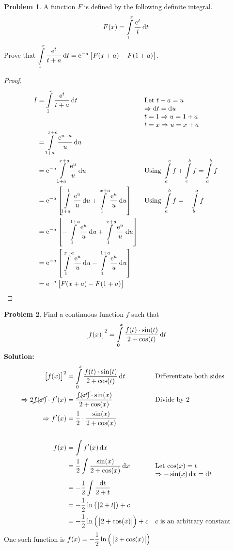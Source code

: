 \documentclass[14]{article}
\theoremstyle{definition}
\newtheorem{prob}{Problem}
\theoremstyle{case}
\begin{document}
\begin{prob}
A function $F$ is defined by the following definite integral.
\[F(x) = \int\limits_1^x \dfrac{{\rm e}^t}{t} \dif t\]
Prove that $\displaystyle\int\limits_1^x \dfrac{{\rm e}^t}{t+a} \dif t = {\rm e}^{-a} \left[ F(x+a) - F(1+a) \right]$.\\
\begin{proof}
\begin{align*}
I &= \int\limits_1^x \dfrac{{\rm e}^t}{t+a} \dif t && \parbox[t]{3cm}{
	Let $t+a = u$\\
	$\Rightarrow \dif t = \dif u$\\
	$t = 1 \Rightarrow u = 1 + a$\\
	$t = x \Rightarrow u = x + a$
}\\
&= \int\limits_{1+a}^{x+a} \dfrac{{\rm e}^{u-a}}{u} \dif u\\
&= {\rm e}^{-a}\int\limits_{1+a}^{x+a} \dfrac{{\rm e}^{u}}{u} \dif u && \text{Using } \int\limits_a^c f + \int\limits_c^b f = \int\limits_a^b f\\ 
&= {\rm e}^{-a} \left[\int\limits_{1+a}^1 \dfrac{{\rm e}^{u}}{u} \dif u + \int\limits_1^{x+a} \dfrac{{\rm e}^{u}}{u} \dif u \right] && \text{Using } \int\limits_a^b f = - \int\limits_b^a f\\
&= {\rm e}^{-a} \left[-\int\limits_1^{1+a} \dfrac{{\rm e}^{u}}{u} \dif u + \int\limits_1^{x+a} \dfrac{{\rm e}^{u}}{u} \dif u \right]\\
&= {\rm e}^{-a} \left[ \int\limits_1^{x+a} \dfrac{{\rm e}^{u}}{u} \dif u -\int\limits_1^{1+a} \dfrac{{\rm e}^{u}}{u} \dif u \right]\\
&= {\rm e}^{-a} \left[F(x+a) - F(1+a) \right]
\end{align*}
\end{proof}
\end{prob}
\pagebreak
\begin{prob}
Find a continuous function $f$ such that
\[\left[ f(x) \right]^2 = \int\limits_0^x \dfrac{f(t) \cdot \sin(t)}{2 + \cos(t)} \dif t\]
\textbf{Solution:}\\
\begin{align*}
\left[ f(x) \right]^2 &= \int\limits_0^x \dfrac{f(t) \cdot \sin(t)}{2 + \cos(t)} \dif t && \text{Differentiate both sides}\\
\Rightarrow 2\cancel{f(x)} \cdot f'(x) &= \dfrac{\cancel{f(x)} \cdot \sin(x)}{2 + \cos(x)} && \text{Divide by } 2\\
\Rightarrow f'(x) &= \dfrac12 \cdot \dfrac{\sin(x)}{2+\cos(x)}\\\\
f(x) &= \int f'(x) \dif x\\
&= \dfrac12 \int\dfrac{\sin(x)}{2+\cos(x)} \dif x && \parbox[t]{3cm}{Let $\cos(x) = t$\\
$\Rightarrow -\sin(x) \dif x = \dif t$}\\
&= -\dfrac12 \int\dfrac{\dif t}{2+t}\\
&= -\dfrac12 \ln\left(\;\abs{2+t}\right) + c\\
&= -\dfrac12 \ln\left(\;\abs{2+\cos(x)}\right) + c && c \text{ is an arbitrary constant}
\end{align*}
One such function is $f(x) = -\dfrac12 \ln\left(\;\abs{2+\cos(x)}\right)$
\end{prob}
\end{document}
